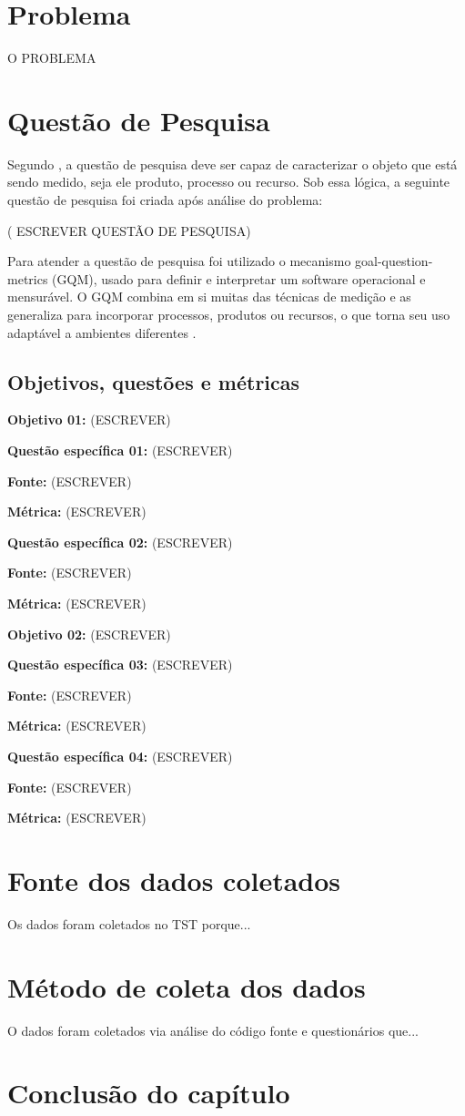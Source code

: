 \section{Problema}

O PROBLEMA


\section{Questão de Pesquisa}

Segundo , a questão de pesquisa deve ser capaz de caracterizar o objeto que está sendo medido, seja ele produto, processo ou recurso. Sob essa lógica, a seguinte questão de pesquisa foi criada após análise do problema:

( ESCREVER QUESTÃO DE PESQUISA)

Para atender a questão de pesquisa foi utilizado o mecanismo goal-question-metrics (GQM), usado para definir e interpretar um software operacional e mensurável. O GQM combina em si muitas das técnicas de medição e as generaliza para incorporar processos, produtos ou recursos, o que torna seu uso adaptável a ambientes diferentes \cite{caldiera_goal_1994}. 


\subsection{Objetivos, questões e métricas}

\textbf{Objetivo 01:} (ESCREVER)

\textbf{Questão específica 01:} (ESCREVER)

\textbf{Fonte:} (ESCREVER)

\textbf{Métrica:} (ESCREVER)

\textbf{Questão específica 02:} (ESCREVER)

\textbf{Fonte:} (ESCREVER)

\textbf{Métrica:} (ESCREVER)

\textbf{Objetivo 02:} (ESCREVER)

\textbf{Questão específica 03:} (ESCREVER)

\textbf{Fonte:} (ESCREVER)

\textbf{Métrica:} (ESCREVER)


\textbf{Questão específica 04:} (ESCREVER)

\textbf{Fonte:} (ESCREVER)

\textbf{Métrica:} (ESCREVER)


\section{Fonte dos dados coletados}

Os dados foram coletados no TST porque...

\section{Método de coleta dos dados}

O dados foram coletados via análise do código fonte e questionários que...

\section{Conclusão do capítulo}

\label{estudo de caso}

